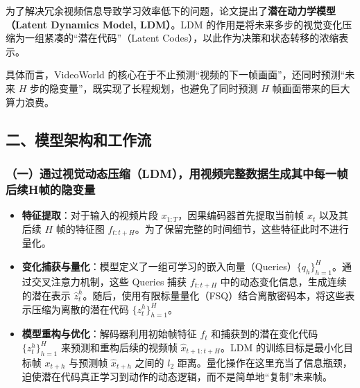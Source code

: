 为了解决冗余视频信息导致学习效率低下的问题，论文提出了\textbf{潜在动力学模型（Latent Dynamics Model, LDM）}。LDM 的作用是将未来多步的视觉变化压缩为一组紧凑的``潜在代码''（Latent Codes），以此作为决策和状态转移的浓缩表示。

具体而言，VideoWorld 的核心在于不止预测``视频的下一帧画面''，还同时预测``未来 \(H\) 步的隐变量''，既实现了长程规划，也避免了同时预测 \(H\) 帧画面带来的巨大算力浪费。

\hypertarget{ux4e8cux6a21ux578bux67b6ux6784ux548cux5de5ux4f5cux6d41}{%
\subsection{二、模型架构和工作流}\label{ux4e8cux6a21ux578bux67b6ux6784ux548cux5de5ux4f5cux6d41}}

\hypertarget{ux4e00ux901aux8fc7ux89c6ux89c9ux52a8ux6001ux538bux7f29ldmux7528ux89c6ux9891ux5b8cux6574ux6570ux636eux751fux6210ux5176ux4e2dux6bcfux4e00ux5e27ux540eux7eedhux5e27ux7684ux9690ux53d8ux91cf}{%
\subsubsection{（一）通过视觉动态压缩（LDM），用视频完整数据生成其中每一帧后续H帧的隐变量}\label{ux4e00ux901aux8fc7ux89c6ux89c9ux52a8ux6001ux538bux7f29ldmux7528ux89c6ux9891ux5b8cux6574ux6570ux636eux751fux6210ux5176ux4e2dux6bcfux4e00ux5e27ux540eux7eedhux5e27ux7684ux9690ux53d8ux91cf}}

\begin{itemize}
\tightlist
\item
  \textbf{特征提取}：对于输入的视频片段 \(x_{1:T}\)，因果编码器首先提取当前帧 \(x_t\) 以及其后续 \(H\) 帧的特征图 \(f_{t:t+H}\)。为了保留完整的时间细节，这些特征此时不进行量化。
\item
  \textbf{变化捕获与量化}：模型定义了一组可学习的嵌入向量（Queries）\(\{q_h\}_{h=1}^H\)。通过交叉注意力机制，这些 Queries 捕获 \(f_{t:t+H}\) 中的动态变化信息，生成连续的潜在表示 \(\hat{z}_{t}^{h}\)。随后，使用有限标量量化（FSQ）结合离散密码本，将这些表示压缩为离散的潜在代码 \(\{z_{t}^{h}\}_{h=1}^H\)。
\item
  \textbf{模型重构与优化}：解码器利用初始帧特征 \(f_t\) 和捕获到的潜在变化代码 \(\{z_{t}^{h}\}_{h=1}^H\) 来预测和重构后续的视频帧 \(\hat{x}_{t+1:t+H}\)。LDM 的训练目标是最小化目标帧 \(x_{t+h}\) 与预测帧 \(\hat{x}_{t+h}\) 之间的 \(l_2\) 距离。量化操作在这里充当了信息瓶颈，迫使潜在代码真正学习到动作的动态逻辑，而不是简单地``复制''未来帧。
\end{itemize}

